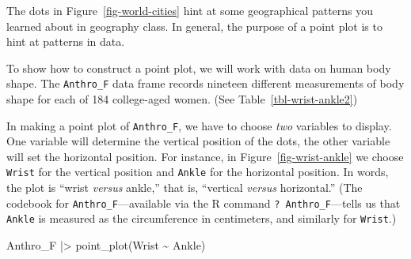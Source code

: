 \documentclass[
  letterpaper,
  DIV=11,
  numbers=noendperiod,
  oneside]{scrartcl}
\newenvironment{Shaded}{\begin{snugshade}}{\end{snugshade}}
\newcommand{\FunctionTok}[1]{\textcolor[rgb]{0.28,0.35,0.67}{#1}}
\newcommand{\NormalTok}[1]{\textcolor[rgb]{0.00,0.23,0.31}{#1}}
\newcommand{\SpecialCharTok}[1]{\textcolor[rgb]{0.37,0.37,0.37}{#1}}
\begin{document}
The dots in Figure~\ref{fig-world-cities} hint at some geographical
patterns you learned about in geography class. In general, the purpose
of a point plot is to hint at patterns in data.

To show how to construct a point plot, we will work with data on human
body shape. The \texttt{Anthro\_F} data frame records nineteen different
measurements of body shape for each of 184 college-aged women. (See
Table~\ref{tbl-wrist-ankle2})

\begin{table}

\caption{\label{tbl-wrist-ankle2}Some selected variables from the
\texttt{Anthro\_F} data frame.}


\end{table}%

In making a point plot of \texttt{Anthro\_F}, we have to choose
\emph{two} variables to display. One variable will determine the
vertical position of the dots, the other variable will set the
horizontal position. For instance, in Figure~\ref{fig-wrist-ankle} we
choose \texttt{Wrist} for the vertical position and \texttt{Ankle} for
the horizontal position. In words, the plot is ``wrist \emph{versus}
ankle,'' that is, ``vertical \emph{versus} horizontal.'' (The codebook
for \texttt{Anthro\_F}---available via the R command
\texttt{?~Anthro\_F}---tells us that \texttt{Ankle} is measured as the
circumference in centimeters, and similarly for \texttt{Wrist}.)

\begin{Shaded}
\begin{Highlighting}[]
\NormalTok{Anthro\_F }\SpecialCharTok{|\textgreater{}} \FunctionTok{point\_plot}\NormalTok{(Wrist }\SpecialCharTok{\textasciitilde{}}\NormalTok{ Ankle)}
\end{Highlighting}
\end{Shaded}
\end{document}
